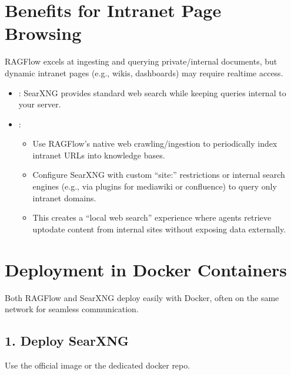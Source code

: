 \documentclass[letterpaper,10pt,english]{sphinxmanual}
\begin{document}
\section{Benefits for Intranet Page Browsing}
\label{\detokenize{searxng:benefits-for-intranet-page-browsing}}
\sphinxAtStartPar
RAGFlow excels at ingesting and querying private/internal documents, but
dynamic intranet pages (e.g., wikis, dashboards) may require real\sphinxhyphen{}time
access.
\begin{itemize}
\item {} 
\sphinxAtStartPar
{}: SearXNG provides standard web search while
keeping queries internal to your server.

\item {} 
\sphinxAtStartPar
{}:
\begin{itemize}
\item {} 
\sphinxAtStartPar
Use RAGFlow’s native web crawling/ingestion to periodically index
intranet URLs into knowledge bases.

\item {} 
\sphinxAtStartPar
Configure SearXNG with custom “site:” restrictions or internal
search engines (e.g., via plugins for mediawiki or confluence) to
query only intranet domains.

\item {} 
\sphinxAtStartPar
This creates a “local web search” experience where agents retrieve
up\sphinxhyphen{}to\sphinxhyphen{}date content from internal sites without exposing data
externally.

\end{itemize}

\end{itemize}


\section{Deployment in Docker Containers}
\label{\detokenize{searxng:deployment-in-docker-containers}}
\sphinxAtStartPar
Both RAGFlow and SearXNG deploy easily with Docker, often on the same
network for seamless communication.


\subsection{1. Deploy SearXNG}
\label{\detokenize{searxng:deploy-searxng}}
\sphinxAtStartPar
Use the official  image or the dedicated docker repo.
\end{document}
